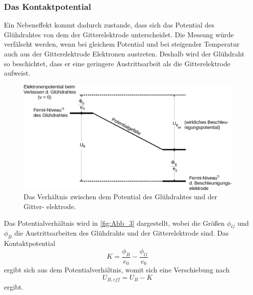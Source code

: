 \subsubsection{Das Kontaktpotential}
\label{subsubsec: Kontaktpotential}
Ein Nebeneffekt kommt dadurch zustande, dass sich das Potential des Glühdrahtes von dem der Gitterelektrode unterscheidet.
Die Messung würde verfälscht werden, wenn bei gleichem Potential und bei steigender Temperatur auch aus der Gitterelektrode Elektronen austreten.
Deshalb wird der Glühdraht so beschichtet, dass er eine geringere Austrittsarbeit als die Gitterelektrode aufweist.
\begin{figure}[H]
    \centering
    \includegraphics[width=\textwidth]{build/Abb_3.png}
    \caption{Das Verhältnis zwischen dem Potential des Glühdrahtes und der Gitter-
    elektrode\cite{V601}.}
    \label{fig:Abb_3}
\end{figure}
Das Potentialverhältnis wird in \autoref{fig:Abb_3} dargestellt, wobei die Größen $\phi_G$ und $\phi_B$ die Austrittsarbeiten des Glühdrahts und
der Gitterelektrode sind.
Das Kontaktpotential 
\begin{equation}
    K = \frac{\phi_B}{e_0} - \frac{\phi_G}{e_0}
    \label{eqn:Kontaktpotential}
\end{equation}
ergibt sich aus dem Potentialverhältnis, womit sich eine Verschiebung nach
\begin{equation}
    U_{B,eff} = U_B - K
    \label{eqn:Verschiebung}
\end{equation}
ergibt.

